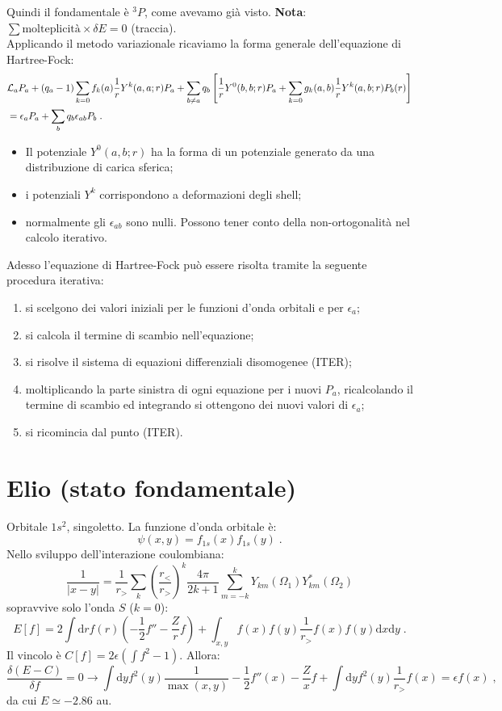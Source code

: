 \documentclass[12pt,a4paper]{report}
\theoremstyle{definition}
\newcommand{\lag}{\mathcal{L}}
\numberwithin{equation}{section}
\newcommand{\diff}[1][]{\mathrm{d}#1}
\begin{document}
Quindi il fondamentale è ${}^3P$, come avevamo già visto. \textbf{Nota}: $\sum \mbox{molteplicità}\times\delta E=0$ (traccia). \\
Applicando il metodo variazionale ricaviamo la forma generale dell'equazione di Hartree-Fock:
\begin{align}
&\lag_aP_a+(q_a-1)\sum_{k=0} f_k(a)\frac{1}{r}Y^k(a,a;r)P_a+\sum_{b\ne a}q_b\left[\frac{1}{r}Y^0(b,b;r)P_a+\sum_{k=0}g_k(a,b)\frac{1}{r}Y^k(a,b;r)P_b(r)\right] \notag \\
&=\epsilon_aP_a+\sum_bq_b\epsilon_{ab}P_b\;.
\end{align}
\begin{itemize}
\item Il potenziale $Y^0(a,b;r)$ ha la forma di un potenziale generato da una distribuzione di carica sferica;
\item i potenziali $Y^k$ corrispondono a deformazioni degli shell;
\item normalmente gli $\epsilon_{ab}$ sono nulli. Possono tener conto della non-ortogonalità nel calcolo iterativo.
\end{itemize}
Adesso l'equazione di Hartree-Fock può essere risolta tramite la seguente procedura iterativa:
\begin{enumerate}
\item si scelgono dei valori iniziali per le funzioni d'onda orbitali e per $\epsilon_a$;
\item si calcola il termine di scambio nell'equazione;
\item si risolve il sistema di equazioni differenziali disomogenee (ITER);
\item moltiplicando la parte sinistra di ogni equazione per i nuovi $P_a$, ricalcolando il termine di scambio ed integrando si ottengono dei nuovi valori di $\epsilon_a$;
\item si ricomincia dal punto (ITER).
\end{enumerate}
\section{Elio (stato fondamentale)}
Orbitale $1s^2$, singoletto. La funzione d'onda orbitale è:
\begin{equation}
\psi(x,y)=f_{1s}(x)f_{1s}(y)\;.
\end{equation}
Nello sviluppo dell'interazione coulombiana:
\begin{equation}
\frac{1}{|x-y|}=\frac{1}{r_>}\sum_k\left(\frac{r_<}{r_>}\right)^k\frac{4\pi}{2k+1}\sum_{m=-k}^{k}Y_{km}(\Omega_1)Y^*_{km}(\Omega_2)
\end{equation}
sopravvive solo l'onda $S$ ($k=0$):
\begin{equation}
E[f]=2\int\diff{r}f(r)\left(-\frac{1}{2}f''-\frac{Z}{r}f\right)+\int_{x,y}f(x)f(y)\frac{1}{r_>}f(x)f(y)\diff{x}\diff{y}\;.
\end{equation}
Il vincolo è $C[f]=2\epsilon\left(\int f^2-1\right)$. Allora:
\begin{equation}
\frac{\delta(E-C)}{\delta f}=0\longrightarrow \int\diff{y}f^2(y)\frac{1}{\max(x,y)}-\frac{1}{2}f''(x)-\frac{Z}{x}f+\int\diff{y}f^2(y)\frac{1}{r_>}f(x)=\epsilon f(x)\;,
\end{equation}
da cui $E\simeq -2.86$ au.
\end{document}
